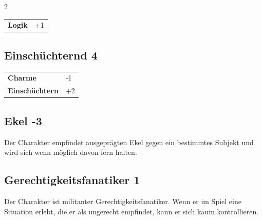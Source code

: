 \begin{multicols}{2}
\begin{tcolorbox}
\begin{tabular}{@{}ll@{}}
    \textbf{Logik} & +1\\
\end{tabular}


\end{tcolorbox}

\begin{tcolorbox}
    \subsection*{Einschüchternd \hfill \small{4 }}
    \tcblower




\begin{tabular}{@{}ll@{}}
    \textbf{Charme} & -1\\
    \textbf{Einschüchtern} & +2\\
\end{tabular}


\end{tcolorbox}

\begin{tcolorbox}
    \subsection*{Ekel \hfill \small{-3 }}
    \tcblower
Der Charakter empfindet ausgeprägten Ekel gegen ein bestimmtes Subjekt und wird sich wenn möglich davon fern halten.


\vspace{3mm}



\end{tcolorbox}

\begin{tcolorbox}
    \subsection*{Gerechtigkeitsfanatiker \hfill \small{1 }}
    \tcblower
Der Charakter ist militanter Gerechtigkeitsfanatiker. Wenn er im Spiel eine Situation erlebt, die er als ungerecht empfindet, kann er sich kaum kontrollieren.



\end{tcolorbox}
\end{multicols}
